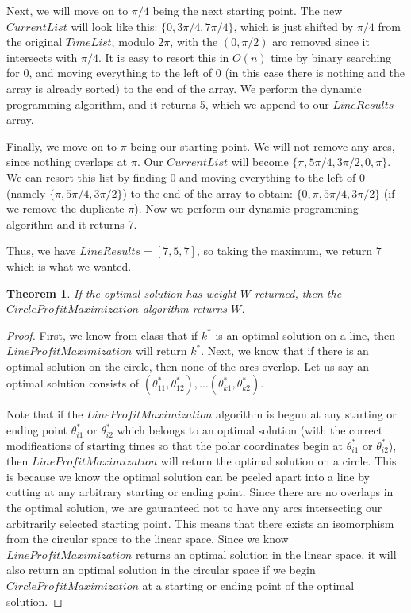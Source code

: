 \documentclass[psamsfonts]{amsart}
\newtheorem{thm}{Theorem}[section]
\newenvironment{sol}{{\bfseries Solution}}{\qedsymbol}
\theoremstyle{definition}
\theoremstyle{remark}
\numberwithin{equation}{section}
\begin{document}
\begin{sol}
Next, we will move on to $\pi/4$ being the next starting point. The new $CurrentList$ will look like this: $\{ 0, 3\pi/4, 7 \pi / 4  \}$, which is just shifted by $\pi/4$ from the original $TimeList$, modulo $2\pi$, with the $(0, \pi/2)$ arc removed since it intersects with $\pi/4$. It is easy to resort this in $O(n)$ time by binary searching for $0$, and moving everything to the left of $0$ (in this case there is nothing and the array is already sorted) to the end of the array. We perform the dynamic programming algorithm, and it returns 5, which we append to our $LineResults$ array.

Finally, we move on to $\pi$ being our starting point. We will not remove any arcs, since nothing overlaps at $\pi$. Our $CurrentList$ will become $\{ \pi, 5\pi/4, 3\pi/2, 0, \pi \}$. We can resort this list by finding $0$ and moving everything to the left of $0$ (namely $ \{\pi, 5\pi/4, 3\pi/2 \}$) to the end of the array to obtain:  $\{0, \pi, 5\pi/4, 3\pi/2 \}$ (if we remove the duplicate $\pi$). Now we perform our dynamic programming algorithm and it returns 7. 

Thus, we have $LineResults = [7,5,7]$, so taking the maximum, we return $7$ which is what we wanted.

\begin{thm}
If the optimal solution has weight $W$ returned, then the $CircleProfitMaximization$ algorithm returns $W$. 
\end{thm}

\begin{proof}
First, we know from class that if $k^*$ is an optimal solution on a line, then $LineProfitMaximization$ will return $k^*$. Next, we know that if there is an optimal solution on the circle, then none of the arcs overlap. Let us say an optimal solution consists of $(\theta_{11}^*, \theta_{12}^*), \ldots (\theta_{k1}^*, \theta_{k2}^*)$. 

Note that if the $LineProfitMaximization$ algorithm is begun at any starting or ending point $\theta_{i1}^*$ or $\theta_{i2}^*$ which belongs to an optimal solution (with the correct modifications of starting times so that the polar coordinates begin at $\theta_{i1}^*$ or $\theta_{i2}^*$), then $LineProfitMaximization$ will return the optimal solution on a circle. This is because we know the optimal solution can be peeled apart into a line by cutting at any arbitrary starting or ending point. Since there are no overlaps in the optimal solution, we are gauranteed not to have any arcs intersecting our arbitrarily selected starting point. This means that there exists an isomorphism from the circular space to the linear space. Since we know $LineProfitMaximization$ returns an optimal solution in the linear space, it will also return an optimal solution in the circular space if we begin $CircleProfitMaximization$ at a starting or ending point of the optimal solution.


\end{proof}
\end{sol}
\end{document}
